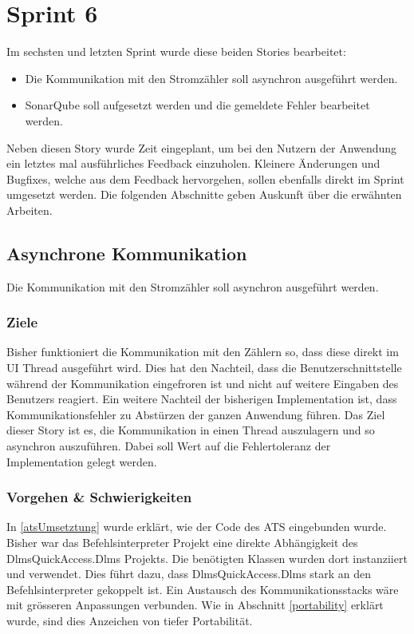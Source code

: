 \section{Sprint 6}\label{s6}
Im sechsten und letzten Sprint wurde diese beiden Stories bearbeitet:
\begin{itemize}
   \item Die Kommunikation mit den Stromzähler soll asynchron ausgeführt werden.
   \item SonarQube soll aufgesetzt werden und die gemeldete Fehler bearbeitet werden.
\end{itemize}
Neben diesen Story wurde Zeit eingeplant, um bei den Nutzern der Anwendung ein letztes mal ausführliches Feedback einzuholen.
Kleinere Änderungen und Bugfixes, welche aus dem Feedback hervorgehen, sollen ebenfalls direkt im Sprint umgesetzt werden.
Die folgenden Abschnitte geben Auskunft über die erwähnten Arbeiten.

\subsection{Asynchrone Kommunikation}
\dq Die Kommunikation mit den Stromzähler soll asynchron ausgeführt werden.\dq
\subsubsection{Ziele}
Bisher funktioniert die Kommunikation mit den Zählern so, dass diese direkt im UI Thread ausgeführt wird.
Dies hat den Nachteil, dass die Benutzerschnittstelle während der Kommunikation eingefroren ist und nicht auf weitere Eingaben des Benutzers reagiert.
Ein weitere Nachteil der bisherigen Implementation ist, dass Kommunikationsfehler zu Abstürzen der ganzen Anwendung führen.
Das Ziel dieser Story ist es, die Kommunikation in einen Thread auszulagern und so asynchron auszuführen.
Dabei soll Wert auf die Fehlertoleranz der Implementation gelegt werden.


\subsubsection{Vorgehen \& Schwierigkeiten}\label{s6vorgehenasync}
In \ref{atsUmsetztung} wurde erklärt, wie der Code des \ac{ATS} eingebunden wurde.
Bisher war das Befehlsinterpreter Projekt eine direkte Abhängigkeit des DlmsQuickAccess.Dlms Projekts.
Die benötigten Klassen wurden dort instanziiert und verwendet. 
Dies führt dazu, dass DlmsQuickAccess.Dlms stark an den Befehlsinterpreter gekoppelt ist.
Ein Austausch des Kommunikationsstacks wäre mit grösseren Anpassungen verbunden.
Wie in Abschnitt \ref{portability} erklärt wurde, sind dies Anzeichen von tiefer Portabilität.

